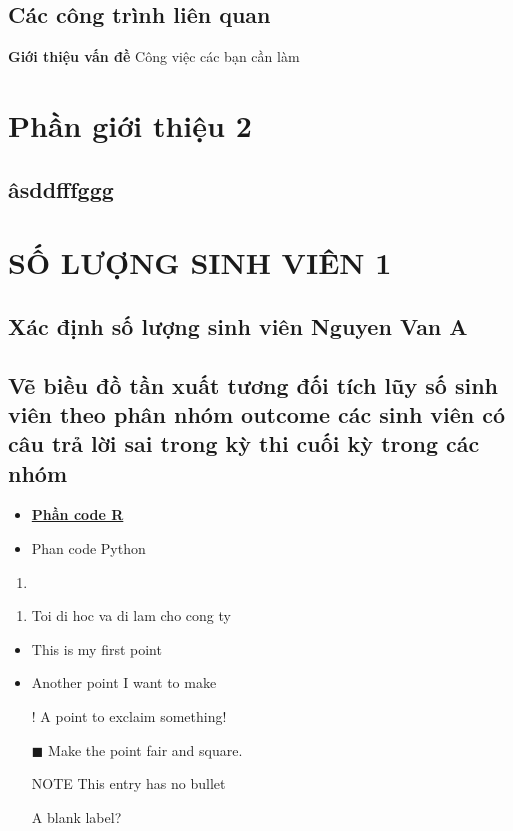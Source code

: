\documentclass[a4paper]{article}
\begin{document}
	\subsection{Các công trình liên quan}
	\textbf{ Giới thiệu vấn đề}
	Công việc các bạn cần làm

 \section{Phần giới thiệu 2}
    \subsection{âsddfffggg}
\newpage
\section{SỐ LƯỢNG SINH VIÊN 1}
\subsection{Xác định số lượng sinh viên Nguyen Van A}
\newpage
\subsection{Vẽ biều đồ tần xuất tương đối tích lũy số sinh viên theo phân nhóm outcome các sinh viên có câu trả lời sai trong kỳ thi cuối kỳ trong các nhóm}
\begin{itemize}
    \item \large\bfseries\underline {Phần code R}
    \item Phan code Python
\end{itemize}
\begin{enumerate}
    \item 
\end{enumerate}
\begin{enumerate}
    \item Toi di hoc va {\color{red}di lam cho cong } ty
\end{enumerate}
\begin{itemize}
  \item This is my first point
  \item Another point I want to make 
  \item[!] A point to exclaim something!
  \item[$\blacksquare$] Make the point fair and square.
  \item[NOTE] This entry has no bullet
  \item[] A blank label?
\end{itemize}
\newpage
\end{document}
